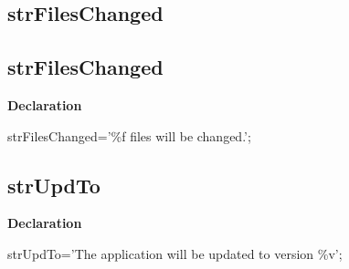 \documentclass{report}
\newif\ifpdf
\begin{document}
\subsection*{\large{\textbf{strFilesChanged}}\normalsize\hspace{1ex}\hrulefill}
\else
\subsection*{strFilesChanged}
\fi
\label{trstrings-strFilesChanged}
\begin{list}{}{
\setlength{\itemindent}{0cm}
\setlength{\listparindent}{0cm}
\setlength{\leftmargin}{\evensidemargin}
\addtolength{\leftmargin}{\tmplength}
\settowidth{\labelsep}{X}
\addtolength{\leftmargin}{\labelsep}
\setlength{\labelwidth}{\tmplength}
}
\item[\textbf{Declaration}\hfill]
\ifpdf
\begin{flushleft}
\fi
\begin{ttfamily}
strFilesChanged='{\%}f files will be changed.';\end{ttfamily}

\ifpdf
\end{flushleft}
\fi

\end{list}
\ifpdf
\subsection*{\large{\textbf{strUpdTo}}\normalsize\hspace{1ex}\hrulefill}
\else
\subsection*{strUpdTo}
\fi
\label{trstrings-strUpdTo}
\begin{list}{}{
\setlength{\itemindent}{0cm}
\setlength{\listparindent}{0cm}
\setlength{\leftmargin}{\evensidemargin}
\addtolength{\leftmargin}{\tmplength}
\settowidth{\labelsep}{X}
\addtolength{\leftmargin}{\labelsep}
\setlength{\labelwidth}{\tmplength}
}
\item[\textbf{Declaration}\hfill]
\ifpdf
\begin{flushleft}
\fi
\begin{ttfamily}
strUpdTo='The application will be updated to version {\%}v';\end{ttfamily}

\ifpdf
\end{flushleft}
\fi

\end{list}
\ifpdf
\end{document}
